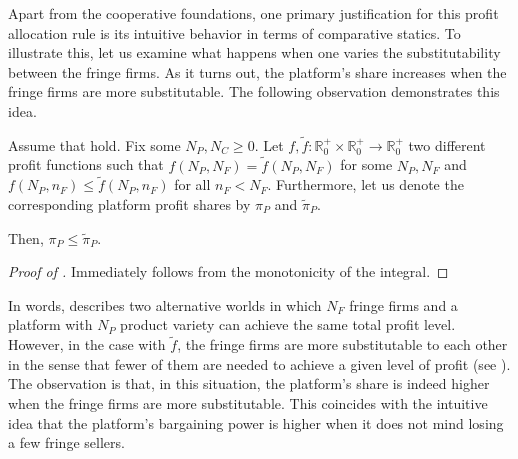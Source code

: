 Apart from the cooperative foundations, one primary justification for this profit allocation rule is its intuitive behavior in terms of comparative statics.
To illustrate this, let us examine what happens when one varies the substitutability between the fringe firms.
As it turns out, the platform's share increases when the fringe firms are more substitutable.
The following observation demonstrates this idea.
\begin{proposition}
    \label{prop:outcome_based_bargaining_power}
    Assume that  hold.
    Fix some $N_P, N_C \geq 0$. Let $f, \tilde{f}: \mathbb{R}^+_0 \times \mathbb{R}^+_0 \to \mathbb{R}^+_0$ two different profit functions such that $f(N_P, N_F) = \tilde{f}(N_P, N_F)$ for some $N_P, N_F$ and $f(N_P, n_F) \leq \tilde{f}(N_P, n_F)$ for all $n_F < N_F$.
    Furthermore, let us denote the corresponding platform profit shares by $\pi_P$ and $\tilde{\pi}_P$.
    
    Then, $\pi_P \leq \tilde{\pi}_P$.
\end{proposition}
\begin{proof}[Proof of ]
    Immediately follows from the monotonicity of the integral.
\end{proof}

In words,  describes two alternative worlds in which $N_F$ fringe firms and a platform with $N_P$ product variety can achieve the same total profit level.
However, in the case with $\tilde{f}$, the fringe firms are more substitutable to each other in the sense that fewer of them are needed to achieve a given level of profit (see ).
The observation is that, in this situation, the platform's share is indeed higher when the fringe firms are more substitutable.
This coincides with the intuitive idea that the platform's bargaining power is higher when it does not mind losing a few fringe sellers.

